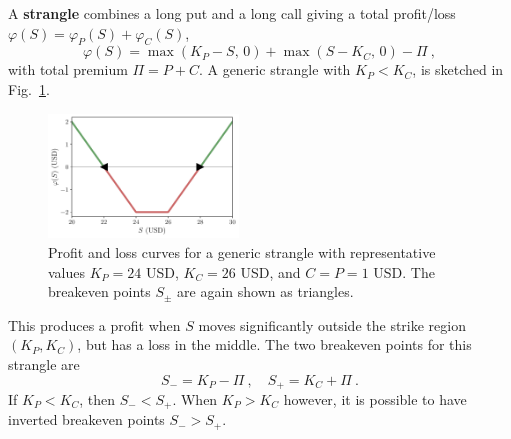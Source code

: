 \documentclass[aps,reprint]{revtex4-2}
\begin{document}
A \textbf{strangle} combines a long put and a long call giving a total profit/loss
$\varphi(S)= \varphi_P(S) + \varphi_C(S)$,
\begin{equation}
\varphi(S) = \max(K_P - S,\,0) + \max(S - K_C,\,0) - \Pi~,
\end{equation}
with total premium $\Pi = P + C$.  
A generic strangle with $K_P < K_C$, is sketched in Fig.~\ref{fig:strangle}.
\begin{figure}[hb]
    \centering
    \includegraphics[width=0.45\textwidth]{figs/strangle.pdf}
    \caption{Profit and loss curves for a generic strangle with representative values
    $K_P = 24$ USD, $K_C = 26$ USD, and $C = P = 1$ USD.
    The breakeven points $S_\pm$ are again shown as triangles.}
    \label{fig:strangle}
\end{figure}
This produces a profit when $S$ moves significantly outside the strike region $(K_P, K_C)$, but has a loss in the middle. 
The two breakeven points for this strangle are
\begin{equation}
S_{-} = K_P - \Pi~, 
\quad 
S_{+} = K_C + \Pi~.
\end{equation}
If $K_P < K_C$, then $S_{-} < S_{+}$.  When $K_P > K_C$ however, it is possible to have inverted breakeven points $S_{-} > S_{+}$.
\end{document}
